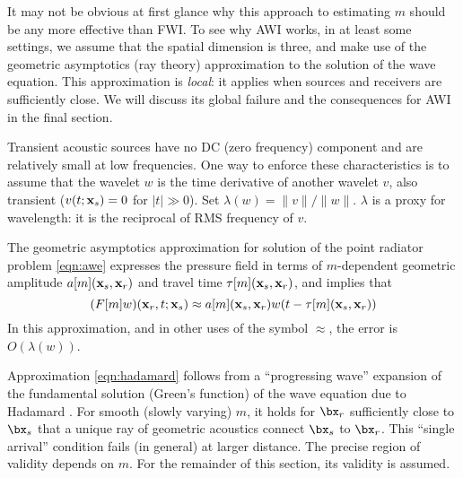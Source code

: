 It may not be obvious at first glance why this approach to estimating
$m$ should be any more effective than FWI. To see why AWI works, in at
least some settings, we assume that the spatial dimension is three,
and make use of the geometric asymptotics (ray theory) approximation
to the solution of the wave equation. This approximation is {\em
  local}: it applies when sources and receivers are sufficiently
close. We will discuss its global failure and the consequences for AWI
in the final section.

Transient acoustic sources have no DC (zero frequency) component and
are relatively small at low frequencies. One way to enforce these
characteristics is to assume that the wavelet $w$ is the time
derivative of another wavelet $v$, also transient ($v(t;{\bf x}_s)=0$
for $|t| \gg 0$). Set $\lambda(w) = \|v\|/\|w\|$. $\lambda$ is a proxy
for wavelength: it is the reciprocal of RMS frequency of $v$.

The geometric asymptotics approximation for solution of the point
radiator problem \ref{eqn:awe} expresses the pressure field in terms
of $m$-dependent geometric amplitude $a[m]({\bf x}_s,{\bf x}_r)$ and
travel time $\tau[m]({\bf x}_s,{\bf x}_r)$, and implies that
\begin{equation}
  \label{eqn:hadamard}
  (F[m]w)({\bf x}_r,t;{\bf x}_s) \approx a[m]({\bf x}_s,{\bf x}_r) w(t-\tau[m]({\bf x}_s,{\bf x}_r)) 
\end{equation}
In this approximation, and in other uses of the symbol $\approx$, the
error is $O(\lambda(w))$.

Approximation \ref{eqn:hadamard} follows from a
``progressing wave''  expansion of the fundamental
solution (Green's function) of the wave equation due to Hadamard
\cite[]{Friedlander:75,Qian:JCP24}. For smooth (slowly varying)
$m$, it holds for $\bx_r$ sufficiently close to $\bx_s$ that a unique ray of
geometric acoustics connect $\bx_s$ to $\bx_r$. This ``single
arrival'' condition fails (in
general) at larger distance. The precise region of validity depends on
$m$. For the remainder of this section, its validity is assumed.

